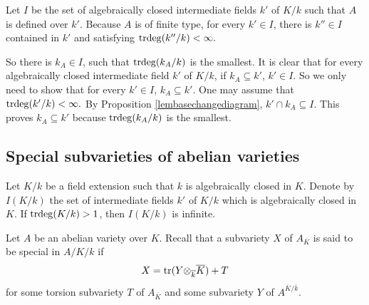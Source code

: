 Let $I$ be the set of algebraically closed intermediate fields $k'$ of  $K/k$ such that $A$  is defined over  $k'$.
Because $A$ is of finite type, for every $k'\in I$, there is $k''\in I$ contained in $k'$ and satisfying ${\mathrm{trdeg}}(k''/k)<\infty.$

So there is $k_A\in I$, such that ${\mathrm{trdeg}}(k_A/k)$ is the smallest.
It is clear that for every algebraically closed intermediate field $k'$ of $K/k$, if $k_A\subseteq k'$, $k'\in I.$
So we only need to show that  for every $k'\in I$, $k_A\subseteq k'.$ One may assume that ${\mathrm{trdeg}}(k'/k)<\infty.$
By Proposition \ref{lembasechangediagram}, $k'\cap k_A\subseteq I.$
This proves $k_A\subseteq k'$ because ${\mathrm{trdeg}}(k_A/k)$ is the smallest.
\endproof

\subsection{Special subvarieties of abelian varieties}\label{subsectionnonspecial}

%

Let $K/k$ be a field extension such that $k$ is algebraically closed in $K$.
Denote by $I(K/k)$ the set of intermediate fields $k'$ of $K/k$ which is algebraically closed in $K.$
If ${\mathrm{trdeg}}(K/k)>1$, then  $I(K/k)$ is infinite.


Let $A$ be an abelian variety over $K$.   Recall that
a subvariety $X$ of $A_{\overline{K}}$ is said to be special in $A/K/k$ if
\begin{equation}
X={\rm tr}(Y{\otimes_{\overline{k}}\overline{K}})+T
\end{equation}
for some torsion subvariety $T$ of $A_{\overline{K}}$ and  some subvariety $Y$ of $A^{\overline{K}/\overline{k}}$.



